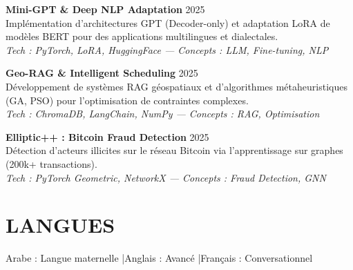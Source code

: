\documentclass[a4paper,12pt]{article}
\begin{document}
{\textbf{Mini-GPT \& Deep NLP Adaptation} \hfill 2025 \\
Implémentation d'architectures GPT (Decoder-only) et adaptation LoRA de modèles BERT pour des applications multilingues et dialectales. \\
\textit{Tech : PyTorch, LoRA, HuggingFace — Concepts : LLM, Fine-tuning, NLP}

\textbf{Geo-RAG \& Intelligent Scheduling} \hfill 2025 \\
Développement de systèmes RAG géospatiaux et d'algorithmes métaheuristiques (GA, PSO) pour l'optimisation de contraintes complexes. \\
\textit{Tech : ChromaDB, LangChain, NumPy — Concepts : RAG, Optimisation}

\textbf{Elliptic++ : Bitcoin Fraud Detection} \hfill 2025 \\
Détection d'acteurs illicites sur le réseau Bitcoin via l'apprentissage sur graphes (200k+ transactions). \\
\textit{Tech : PyTorch Geometric, NetworkX — Concepts : Fraud Detection, GNN}
}

\section{LANGUES}
Arabe : Langue maternelle \quad|\quad Anglais : Avancé \quad|\quad Français : Conversationnel
\end{document}
